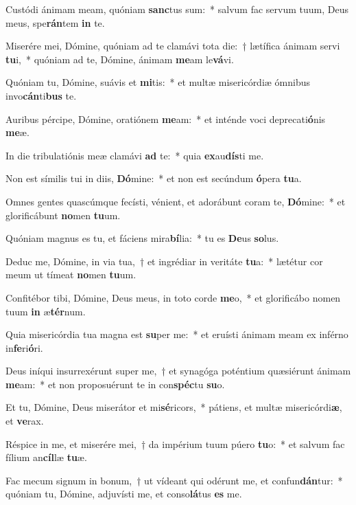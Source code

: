 \item Custódi ánimam meam, quóniam \textbf{sanc}tus sum:~* salvum fac servum tuum, Deus meus, spe\textbf{rán}tem \textbf{in} te.
\item Miserére mei, Dómine, quóniam ad te clamávi tota die:~† lætífica ánimam servi \textbf{tu}i,~* quóniam ad te, Dómine, ánimam \textbf{me}am le\textbf{vá}vi.
\item Quóniam tu, Dómine, suávis et \textbf{mi}tis:~* et multæ misericórdiæ ómnibus invo\textbf{cán}ti\textbf{bus} te.
\item Auribus pércipe, Dómine, oratiónem \textbf{me}am:~* et inténde voci deprecati\textbf{ó}nis \textbf{me}æ.
\item In die tribulatiónis meæ clamávi \textbf{ad} te:~* quia \textbf{ex}au\textbf{dís}ti me.
\item Non est símilis tui in diis, \textbf{Dó}mine:~* et non est secúndum \textbf{ó}pera \textbf{tu}a.
\item Omnes gentes quascúmque fecísti, vénient, et adorábunt coram te, \textbf{Dó}mine:~* et glorificábunt \textbf{no}men \textbf{tu}um.
\item Quóniam magnus es tu, et fáciens mira\textbf{bí}lia:~* tu es \textbf{De}us \textbf{so}lus.
\item Deduc me, Dómine, in via tua,~† et ingrédiar in veritáte \textbf{tu}a:~* lætétur cor meum ut tímeat \textbf{no}men \textbf{tu}um.
\item Confitébor tibi, Dómine, Deus meus, in toto corde \textbf{me}o,~* et glorificábo nomen tuum \textbf{in} æ\textbf{tér}num.
\item Quia misericórdia tua magna est \textbf{su}per me:~* et eruísti ánimam meam ex inférno in\textbf{fe}ri\textbf{ó}ri.
\item Deus iníqui insurrexérunt super me,~† et synagóga poténtium quæsiérunt ánimam \textbf{me}am:~* et non proposuérunt te in con\textbf{spéc}tu \textbf{su}o.
\item Et tu, Dómine, Deus miserátor et mi\textbf{sé}ricors,~* pátiens, et multæ misericórdi\textbf{æ}, et \textbf{ve}rax.
\item Réspice in me, et miserére mei,~† da impérium tuum púero \textbf{tu}o:~* et salvum fac fílium an\textbf{cíl}læ \textbf{tu}æ.
\item Fac mecum signum in bonum,~† ut vídeant qui odérunt me, et confun\textbf{dán}tur:~* quóniam tu, Dómine, adjuvísti me, et conso\textbf{lá}tus \textbf{es} me.
